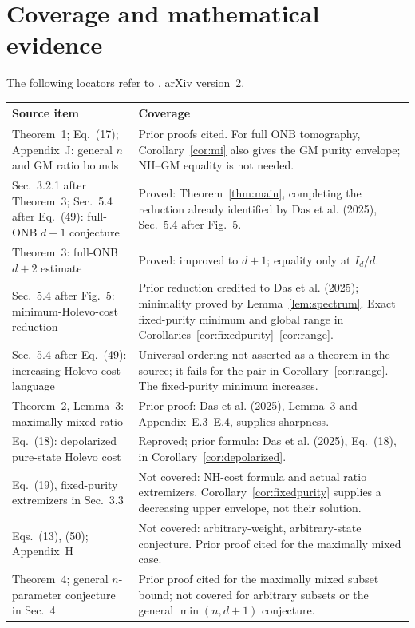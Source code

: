 \documentclass[11pt]{article}
\newcommand{\Id}{I}
\begin{document}
\section{Coverage and mathematical evidence}
The following locators refer to \cite{Das}, arXiv version~2.
\begin{center}\small
\begin{tabular}{@{}p{.43\linewidth}p{.51\linewidth}@{}}
\toprule
Source item & Coverage\\\midrule
Theorem~1; Eq.~(17); Appendix~J: general $n$ and GM ratio bounds
& Prior proofs cited. For full ONB tomography, Corollary~\ref{cor:mi} also gives the GM purity envelope; NH--GM equality is not needed.\\[3pt]
Sec.~3.2.1 after Theorem~3; Sec.~5.4 after Eq.~(49): full-ONB $d+1$ conjecture
& Proved: Theorem~\ref{thm:main}, completing the reduction already identified by Das et al. (2025), Sec.~5.4 after Fig.~5.\\[3pt]
Theorem~3: full-ONB $d+2$ estimate
& Proved: improved to $d+1$; equality only at $\Id_d/d$.\\[3pt]
Sec.~5.4 after Fig.~5: minimum-Holevo-cost reduction
& Prior reduction credited to Das et al. (2025); minimality proved by Lemma~\ref{lem:spectrum}. Exact fixed-purity minimum and global range in Corollaries~\ref{cor:fixedpurity}--\ref{cor:range}.\\[3pt]
Sec.~5.4 after Eq.~(49): increasing-Holevo-cost language
& Universal ordering not asserted as a theorem in the source; it fails for the pair in Corollary~\ref{cor:range}. The fixed-purity minimum increases.\\[3pt]
Theorem~2, Lemma~3: maximally mixed ratio
& Prior proof: Das et al. (2025), Lemma~3 and Appendix~E.3--E.4, supplies sharpness.\\[3pt]
Eq.~(18): depolarized pure-state Holevo cost
& Reproved; prior formula: Das et al. (2025), Eq.~(18), in Corollary~\ref{cor:depolarized}.\\[3pt]
Eq.~(19), fixed-purity extremizers in Sec.~3.3
& Not covered: NH-cost formula and actual ratio extremizers. Corollary~\ref{cor:fixedpurity} supplies a decreasing upper envelope, not their solution.\\[3pt]
Eqs.~(13), (50); Appendix~H
& Not covered: arbitrary-weight, arbitrary-state conjecture. Prior proof cited for the maximally mixed case.\\[3pt]
Theorem~4; general $n$-parameter conjecture in Sec.~4
& Prior proof cited for the maximally mixed subset bound; not covered for arbitrary subsets or the general $\min(n,d+1)$ conjecture.\\[3pt]

\end{tabular}
\end{center}
\end{document}
